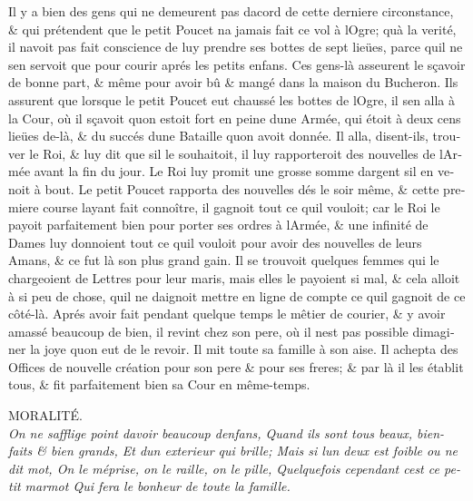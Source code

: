 \documentclass[14pt,a4paper]{memoir}
\begin{document}
\begin{otherlanguage}{french}
Il y a bien des gens qui ne demeurent pas d\textquotesingle acord de
cette derniere circonstance, \& qui prétendent que le petit Poucet
n\textquotesingle a jamais fait ce vol à l\textquotesingle Ogre;
qu\textquotesingle à la verité, il n\textquotesingle avoit pas fait
conscience de luy prendre ses bottes de sept lieües, parce
qu\textquotesingle il ne s\textquotesingle en servoit que pour courir
aprés les petits enfans. Ces gens-là asseurent le sçavoir de bonne part,
\& même pour avoir bû \& mangé dans la maison du Bucheron. Ils assurent
que lorsque le petit Poucet eut chaussé les bottes de
l\textquotesingle Ogre, il s\textquotesingle en alla à la Cour, où il
sçavoit qu\textquotesingle on estoit fort en peine d\textquotesingle une
Armée, qui étoit à deux cens lieües de-là, \& du succés
d\textquotesingle une Bataille qu\textquotesingle on avoit donnée. Il
alla, disent-ils, trouver le Roi, \& luy dit que s\textquotesingle il le
souhaitoit, il luy rapporteroit des nouvelles de l\textquotesingle Armée
avant la fin du jour. Le Roi luy promit une grosse somme
d\textquotesingle argent s\textquotesingle il en venoit à bout. Le petit
Poucet rapporta des nouvelles dés le soir même, \& cette premiere course
l\textquotesingle ayant fait connoître, il gagnoit tout ce
qu\textquotesingle il vouloit; car le Roi le payoit parfaitement bien
pour porter ses ordres à l\textquotesingle Armée, \& une infinité de
Dames luy donnoient tout ce qu\textquotesingle il vouloit pour avoir des
nouvelles de leurs Amans, \& ce fut là son plus grand gain. Il se
trouvoit quelques femmes qui le chargeoient de Lettres pour leur maris,
mais elles le payoient si mal, \& cela alloit à si peu de chose,
qu\textquotesingle il ne daignoit mettre en ligne de compte ce
qu\textquotesingle il gagnoit de ce côté-là. Aprés avoir fait pendant
quelque temps le mêtier de courier, \& y avoir amassé beaucoup de bien,
il revint chez son pere, où il n\textquotesingle est pas possible
d\textquotesingle imaginer la joye qu\textquotesingle on eut de le
revoir. Il mit toute sa famille à son aise. Il achepta des Offices de
nouvelle création pour son pere \& pour ses freres; \& par là il les
établit tous, \& fit parfaitement bien sa Cour en même-temps.

MORALITÉ. \\

\emph{{On ne s\textquotesingle afflige point d\textquotesingle avoir
beaucoup d\textquotesingle enfans,} {Quand ils sont tous beaux,
bien-faits \& bien grands,} {Et d\textquotesingle un exterieur qui
brille;} {Mais si l\textquotesingle un d\textquotesingle eux est foible
ou ne dit mot,} {On le méprise, on le raille, on le pille,} {Quelquefois
cependant c\textquotesingle est ce petit marmot} {Qui fera le bonheur de
toute la famille.}}


\end{otherlanguage}
\end{document}
